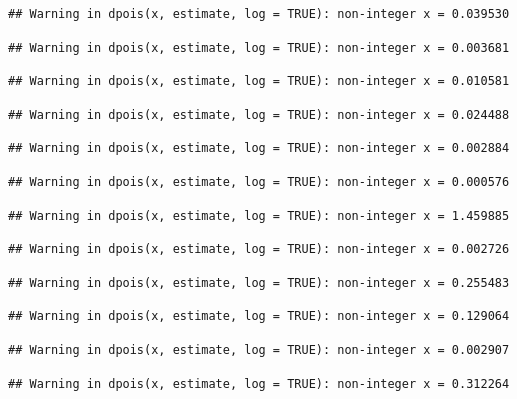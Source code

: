 \documentclass[]{article}
\begin{document}
\begin{verbatim}
## Warning in dpois(x, estimate, log = TRUE): non-integer x = 0.039530
\end{verbatim}

\begin{verbatim}
## Warning in dpois(x, estimate, log = TRUE): non-integer x = 0.003681
\end{verbatim}

\begin{verbatim}
## Warning in dpois(x, estimate, log = TRUE): non-integer x = 0.010581
\end{verbatim}

\begin{verbatim}
## Warning in dpois(x, estimate, log = TRUE): non-integer x = 0.024488
\end{verbatim}

\begin{verbatim}
## Warning in dpois(x, estimate, log = TRUE): non-integer x = 0.002884
\end{verbatim}

\begin{verbatim}
## Warning in dpois(x, estimate, log = TRUE): non-integer x = 0.000576
\end{verbatim}

\begin{verbatim}
## Warning in dpois(x, estimate, log = TRUE): non-integer x = 1.459885
\end{verbatim}

\begin{verbatim}
## Warning in dpois(x, estimate, log = TRUE): non-integer x = 0.002726
\end{verbatim}

\begin{verbatim}
## Warning in dpois(x, estimate, log = TRUE): non-integer x = 0.255483
\end{verbatim}

\begin{verbatim}
## Warning in dpois(x, estimate, log = TRUE): non-integer x = 0.129064
\end{verbatim}

\begin{verbatim}
## Warning in dpois(x, estimate, log = TRUE): non-integer x = 0.002907
\end{verbatim}

\begin{verbatim}
## Warning in dpois(x, estimate, log = TRUE): non-integer x = 0.312264
\end{verbatim}
\end{document}
